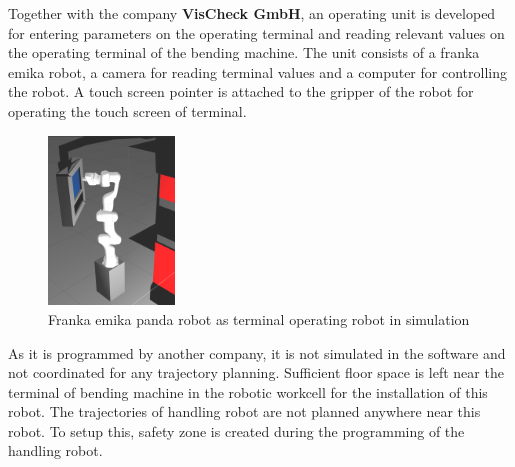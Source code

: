 Together with the company \textbf{VisCheck GmbH}, an operating unit is developed
for entering parameters on the operating terminal and reading relevant values on the operating
terminal of the bending machine. The unit consists of a franka emika robot, a camera for reading terminal values
and a computer for controlling the robot. A touch screen pointer is attached to the gripper of the robot
for operating the touch screen of terminal.

\begin{figure}[h]
    \centering
    \includegraphics[width=0.3\textwidth]{figures/panda-robot-simulation.png}
    \caption{Franka emika panda robot as terminal operating robot in simulation}
    \label{fig:terminal-robot}
\end{figure}

As it is programmed by another company, it is not simulated in the software and not coordinated for any trajectory planning. Sufficient floor space
is left near the terminal of bending machine in the robotic workcell for the installation of this robot.
The trajectories of handling robot are not planned anywhere near this robot. To setup this, safety zone is created
during the programming of the handling robot.
